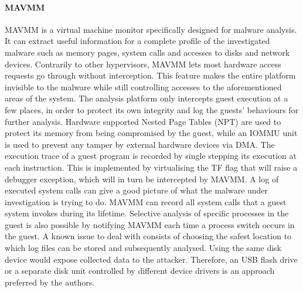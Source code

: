 \paragraph{MAVMM}
MAVMM \cite{MAVMM} is a virtual machine monitor specifically designed for malware analysis. It can extract useful information for a complete profile of the investigated malware such as memory pages, system calls and accesses to disks and network devices. Contrarily to other hypervisors, MAVMM lets most hardware access requests go through without interception. This feature makes the entire platform invisible to the malware while still controlling accesses to the aforementioned areas of the system. The analysis platform only intercepts guest execution at a few places, in order to protect its own integrity and log the guests' behaviours for further analysis. Hardware supported Nested Page Tables (NPT) are used to protect its memory from being compromised by the guest, while an IOMMU unit is used to prevent any tamper by external hardware devices via DMA.
The execution trace of a guest program is recorded by single stepping its execution at each instruction. This is implemented by virtualising the TF flag that will raise a debugger exception, which will in turn be intercepted by MAVMM. 
A log of executed system calls can give a good picture of what the malware under investigation is trying to do. MAVMM can record all system calls that a guest system invokes during its lifetime. Selective analysis of specific processes in the guest is also possible by notifying MAVMM each time a process switch occurs in the guest.
A known issue to deal with consists of choosing the safest location to which log files can be stored and subsequently analysed. Using the same disk device would expose collected data to the attacker. Therefore, an USB flash drive or a separate disk unit controlled by different device drivers is an approach preferred by the authors.


